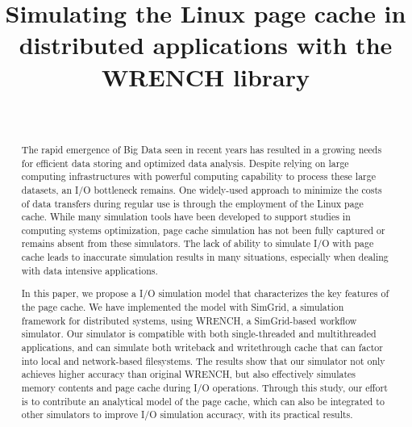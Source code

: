\documentclass[conference]{IEEEtran}
\begin{document}
\title{Simulating the Linux page cache in distributed applications with the WRENCH library}

\author{\\
}

\maketitle

    \begin{abstract}
        
        The rapid emergence of Big Data seen in recent years has resulted in a 
        growing needs for efficient data storing and optimized data analysis. 
        Despite relying on large computing infrastructures with powerful computing capability 
        to process these large datasets, an I/O bottleneck remains. 
        One widely-used approach to minimize the costs of data transfers during
        regular use is through the employment of the Linux page cache.
        While many simulation tools have been developed to 
        support studies in computing systems optimization, page cache simulation 
        has not been fully captured or remains absent from these simulators. 
        The lack of ability to simulate I/O with page cache leads to inaccurate 
        simulation results in many situations, especially when dealing with data intensive applications. 
        
        In this paper, we propose a I/O simulation model that characterizes the key features of the page cache.
        We have implemented the model with SimGrid, a simulation framework for 
        distributed systems, using WRENCH, a SimGrid-based workflow simulator. 
        Our simulator is compatible with both single-threaded and multithreaded applications,
        and can simulate both writeback and writethrough cache that can factor into local
        and network-based filesystems.
        The results show that our simulator not only achieves higher accuracy than 
        original WRENCH, but also effectively simulates memory contents and 
        page cache during I/O operations. 
        Through this study, our effort is to contribute an analytical model 
        of the page cache, which can also be integrated to other simulators 
        to improve I/O simulation accuracy, with its practical results. 
        
    \end{abstract}         
\end{document}
